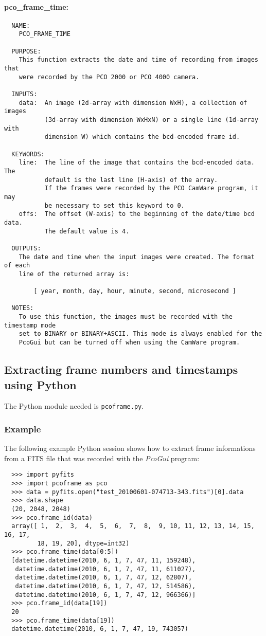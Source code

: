 \documentclass[11pt, a4paper]{scrartcl}
\begin{document}
\paragraph{pco\_frame\_time:}
\begin{verbatim}
  NAME:
    PCO_FRAME_TIME

  PURPOSE:
    This function extracts the date and time of recording from images that
    were recorded by the PCO 2000 or PCO 4000 camera.

  INPUTS:
    data:  An image (2d-array with dimension WxH), a collection of images
           (3d-array with dimension WxHxN) or a single line (1d-array with
           dimension W) which contains the bcd-encoded frame id.

  KEYWORDS:
    line:  The line of the image that contains the bcd-encoded data. The
           default is the last line (H-axis) of the array.
           If the frames were recorded by the PCO CamWare program, it may
           be necessary to set this keyword to 0.
    offs:  The offset (W-axis) to the beginning of the date/time bcd data.
           The default value is 4.

  OUTPUTS:
    The date and time when the input images were created. The format of each
    line of the returned array is:

        [ year, month, day, hour, minute, second, microsecond ]

  NOTES:
    To use this function, the images must be recorded with the timestamp mode
    set to BINARY or BINARY+ASCII. This mode is always enabled for the
    PcoGui but can be turned off when using the CamWare program.
\end{verbatim}

\clearpage
\subsection{Extracting frame numbers and timestamps using Python}
The Python module needed is \texttt{pcoframe.py}.

\subsubsection{Example}
The following example Python session shows how to extract frame informations from a FITS file that was recorded with the \emph{PcoGui} program:
\begin{verbatim}
  >>> import pyfits
  >>> import pcoframe as pco
  >>> data = pyfits.open("test_20100601-074713-343.fits")[0].data
  >>> data.shape
  (20, 2048, 2048)
  >>> pco.frame_id(data)
  array([ 1,  2,  3,  4,  5,  6,  7,  8,  9, 10, 11, 12, 13, 14, 15, 16, 17,
         18, 19, 20], dtype=int32)
  >>> pco.frame_time(data[0:5])
  [datetime.datetime(2010, 6, 1, 7, 47, 11, 159248),
   datetime.datetime(2010, 6, 1, 7, 47, 11, 611027),
   datetime.datetime(2010, 6, 1, 7, 47, 12, 62807),
   datetime.datetime(2010, 6, 1, 7, 47, 12, 514586),
   datetime.datetime(2010, 6, 1, 7, 47, 12, 966366)]
  >>> pco.frame_id(data[19])
  20
  >>> pco.frame_time(data[19])
  datetime.datetime(2010, 6, 1, 7, 47, 19, 743057)
\end{verbatim}
\end{document}
